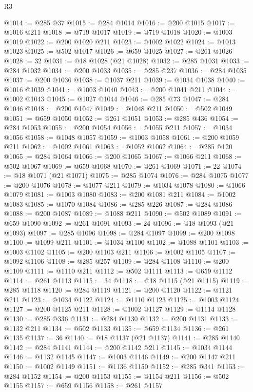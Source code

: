 \begin{lexlean}{R3}
\begin{coremodule}
@1014 := @285 @37
@1015 := @284 @1014
@1016 := @200 @1015
@1017 := @1016 @211
@1018 := @719 @1017
@1019 := @719 @1018
@1020 := @1003 @1019
@1022 := @200 @1020 @211
@1023 := @1002 @1022
@1024 := @1013 @1023
@1025 := @502 @1017
@1026 := @659 @1025
@1027 := @261 @1026
@1028 := 32
@1031 := @18 @1028 (@21 @1028)
@1032 := @285 @1031
@1033 := @284 @1032
@1034 := @200 @1033
@1035 := @285 @237
@1036 := @284 @1035
@1037 := @200 @1036
@1038 := @1037 @211
@1039 := @1034 @1038
@1040 := @1016 @1039
@1041 := @1003 @1040
@1043 := @200 @1041 @211
@1044 := @1002 @1043
@1045 := @1027 @1044
@1046 := @285 @73
@1047 := @284 @1046
@1048 := @200 @1047
@1049 := @1048 @211
@1050 := @502 @1049
@1051 := @659 @1050
@1052 := @261 @1051
@1053 := @285 @436
@1054 := @284 @1053
@1055 := @200 @1054
@1056 := @1055 @211
@1057 := @1034 @1056
@1058 := @1048 @1057
@1059 := @1003 @1058
@1061 := @200 @1059 @211
@1062 := @1002 @1061
@1063 := @1052 @1062
@1064 := @285 @120
@1065 := @284 @1064
@1066 := @200 @1065
@1067 := @1066 @211
@1068 := @502 @1067
@1069 := @659 @1068
@1070 := @261 @1069
@1071 := 22
@1074 := @18 @1071 (@21 @1071)
@1075 := @285 @1074
@1076 := @284 @1075
@1077 := @200 @1076
@1078 := @1077 @211
@1079 := @1034 @1078
@1080 := @1066 @1079
@1081 := @1003 @1080
@1083 := @200 @1081 @211
@1084 := @1002 @1083
@1085 := @1070 @1084
@1086 := @285 @226
@1087 := @284 @1086
@1088 := @200 @1087
@1089 := @1088 @211
@1090 := @502 @1089
@1091 := @659 @1090
@1092 := @261 @1091
@1093 := 24
@1096 := @18 @1093 (@21 @1093)
@1097 := @285 @1096
@1098 := @284 @1097
@1099 := @200 @1098
@1100 := @1099 @211
@1101 := @1034 @1100
@1102 := @1088 @1101
@1103 := @1003 @1102
@1105 := @200 @1103 @211
@1106 := @1002 @1105
@1107 := @1092 @1106
@1108 := @285 @257
@1109 := @284 @1108
@1110 := @200 @1109
@1111 := @1110 @211
@1112 := @502 @1111
@1113 := @659 @1112
@1114 := @261 @1113
@1115 := 34
@1118 := @18 @1115 (@21 @1115)
@1119 := @285 @1118
@1120 := @284 @1119
@1121 := @200 @1120
@1122 := @1121 @211
@1123 := @1034 @1122
@1124 := @1110 @1123
@1125 := @1003 @1124
@1127 := @200 @1125 @211
@1128 := @1002 @1127
@1129 := @1114 @1128
@1130 := @285 @336
@1131 := @284 @1130
@1132 := @200 @1131
@1133 := @1132 @211
@1134 := @502 @1133
@1135 := @659 @1134
@1136 := @261 @1135
@1137 := 36
@1140 := @18 @1137 (@21 @1137)
@1141 := @285 @1140
@1142 := @284 @1141
@1144 := @200 @1142 @211
@1145 := @1034 @1144
@1146 := @1132 @1145
@1147 := @1003 @1146
@1149 := @200 @1147 @211
@1150 := @1002 @1149
@1151 := @1136 @1150
@1152 := @285 @341
@1153 := @284 @1152
@1154 := @200 @1153
@1155 := @1154 @211
@1156 := @502 @1155
@1157 := @659 @1156
@1158 := @261 @1157

\end{coremodule}
\end{lexlean}
